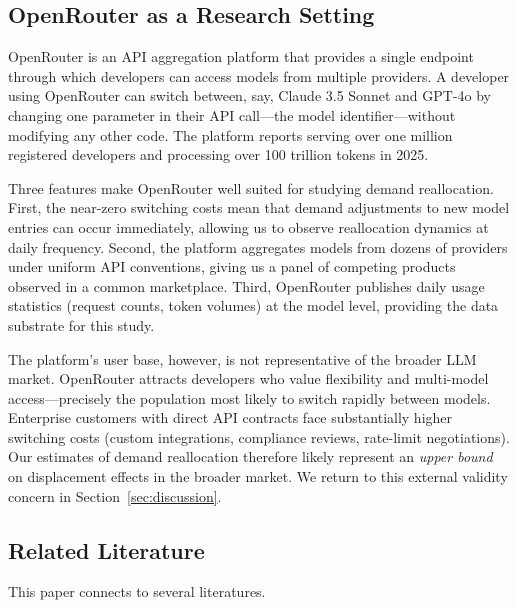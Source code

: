 \documentclass[11pt, a4paper]{article}
\begin{document}
\subsection{OpenRouter as a Research Setting}

OpenRouter is an API aggregation platform that provides a single endpoint through which developers can access models from multiple providers. A developer using OpenRouter can switch between, say, Claude 3.5 Sonnet and GPT-4o by changing one parameter in their API call---the model identifier---without modifying any other code. The platform reports serving over one million registered developers and processing over 100 trillion tokens in 2025.

Three features make OpenRouter well suited for studying demand reallocation. First, the near-zero switching costs mean that demand adjustments to new model entries can occur immediately, allowing us to observe reallocation dynamics at daily frequency. Second, the platform aggregates models from dozens of providers under uniform API conventions, giving us a panel of competing products observed in a common marketplace. Third, OpenRouter publishes daily usage statistics (request counts, token volumes) at the model level, providing the data substrate for this study.

The platform's user base, however, is not representative of the broader LLM market. OpenRouter attracts developers who value flexibility and multi-model access---precisely the population most likely to switch rapidly between models. Enterprise customers with direct API contracts face substantially higher switching costs (custom integrations, compliance reviews, rate-limit negotiations). Our estimates of demand reallocation therefore likely represent an \emph{upper bound} on displacement effects in the broader market. We return to this external validity concern in Section~\ref{sec:discussion}.

\subsection{Related Literature}

This paper connects to several literatures.
\end{document}
